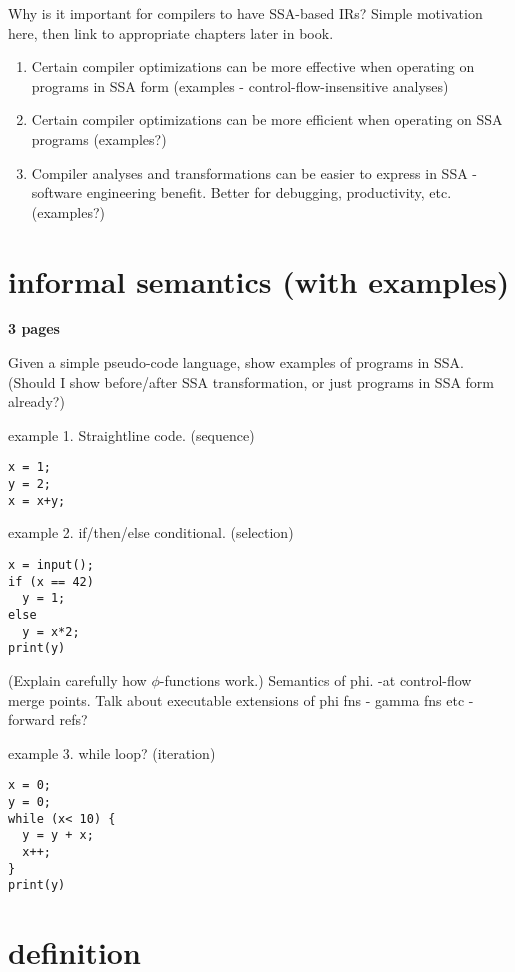 Why is it important for compilers to have SSA-based IRs? Simple motivation
here, then link to appropriate chapters later in book.
\begin{enumerate}
\item Certain compiler optimizations can be more effective
when operating on programs in SSA form
(examples - control-flow-insensitive
analyses)
\item Certain compiler optimizations can be more efficient
when operating on SSA programs (examples?) 
\item Compiler analyses and transformations can be easier
to express in SSA - software engineering benefit. Better
for debugging, productivity, etc. (examples?)
\end{enumerate}



\section{informal semantics (with examples)}

\textbf{3 pages}

Given a simple pseudo-code language, show examples of programs in SSA.
(Should I show before/after SSA transformation, or just programs
in SSA form already?)

example 1. Straightline code. (sequence)

\begin{verbatim}
x = 1;
y = 2;
x = x+y;
\end{verbatim}

example 2. if/then/else conditional.  (selection)

\begin{verbatim}
x = input();
if (x == 42)
  y = 1;
else
  y = x*2;
print(y)
\end{verbatim}

(Explain carefully how $\phi$-functions work.) 
Semantics of phi. -at control-flow merge points.
Talk about executable extensions of phi fns - gamma fns etc - 
forward refs?

example 3. while loop? (iteration)

\begin{verbatim}
x = 0;
y = 0;
while (x< 10) {
  y = y + x;
  x++;
}
print(y)
\end{verbatim}


\section{definition}

